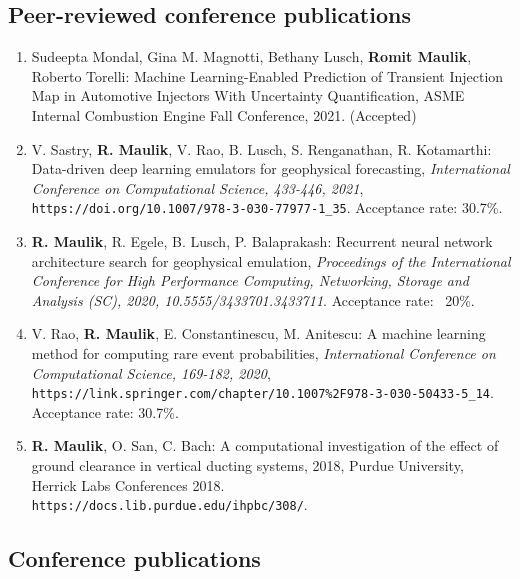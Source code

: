 \documentclass[letterpaper]{article}
\begin{document}
\subsection*{Peer-reviewed conference publications}

\begin{enumerate}

\item Sudeepta Mondal, Gina M. Magnotti, Bethany Lusch, \textbf{Romit Maulik}, Roberto Torelli: Machine Learning-Enabled Prediction of Transient Injection Map in Automotive Injectors With Uncertainty Quantification, ASME Internal Combustion Engine Fall Conference, 2021. (Accepted)

\item V. Sastry, \textbf{R. Maulik}, V. Rao, B. Lusch, S. Renganathan, R. Kotamarthi: Data-driven deep learning emulators for geophysical forecasting, {\it International Conference on Computational Science, 433-446, 2021}, \\ \texttt{https://doi.org/10.1007/978-3-030-77977-1\_35}. Acceptance rate: 30.7\%.

\item \textbf{R. Maulik}, R. Egele, B. Lusch,  P. Balaprakash: Recurrent neural network architecture search for geophysical emulation, {\it Proceedings of the International Conference for High Performance Computing, Networking, Storage and Analysis (SC), 2020, 10.5555/3433701.3433711}. Acceptance rate: ~20\%.

\item V. Rao, \textbf{R. Maulik}, E. Constantinescu, M. Anitescu: A machine learning method for computing rare event probabilities, {\it International Conference on Computational Science, 169-182, 2020}, \\ \texttt{https://link.springer.com/chapter/10.1007\%2F978-3-030-50433-5\_14}. Acceptance rate: 30.7\%.

\item \textbf{R. Maulik}, O. San, C. Bach: A computational investigation of the effect of ground clearance in vertical ducting systems, 2018, Purdue University, Herrick Labs Conferences 2018. \\ \texttt{https://docs.lib.purdue.edu/ihpbc/308/}.

\end{enumerate}

\subsection*{Conference publications}
\end{document}
